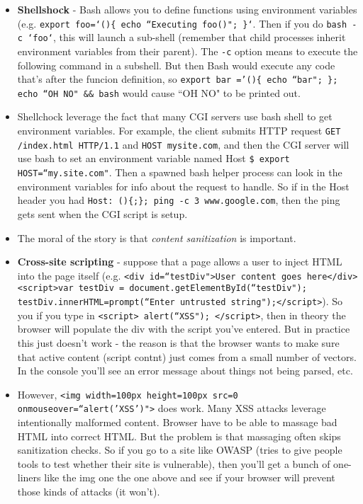 \documentclass[12pt]{article}
\theoremstyle{definition}
\begin{document}
\begin{itemize}
    \item \textbf{Shellshock} - Bash allows you to define functions using environment variables (e.g. \texttt{export foo=`()\{ echo ``Executing foo()"; \}`}. Then if you do \texttt{bash -c `foo`}, this will launch a sub-shell (remember that child processes inherit environment variables from their parent). The \texttt{-c} option means to execute the following command in a subshell. But then Bash would execute any code that's after the funcion definition, so \texttt{export bar ='()\{ echo ``bar"; \}; echo ``OH NO" \&\& bash} would cause ``OH NO" to be printed out.
    \item Shellchock leverage the fact that many CGI servers use bash shell to get environment variables. For example, the client submits HTTP request \texttt{GET /index.html HTTP/1.1} and \texttt{HOST mysite.com}, and then the CGI server will use bash to set an environment variable named Host \texttt{\$ export HOST=``my.site.com"}. Then a spawned bash helper process can look in the environment variables for info about the request to handle. So if in the Host header you had \texttt{Host: ()\{;\}; ping -c 3 www.google.com}, then the ping gets sent when the CGI script is setup. 
    \item The moral of the story is that \textit{content sanitization} is important.
    \item \textbf{Cross-site scripting} - suppose that a page allows a user to inject HTML into the page itself (e.g. \texttt{<div id=``testDiv">User content goes here</div><script>var testDiv = document.getElementById(``testDiv"); testDiv.innerHTML=prompt(``Enter untrusted string");</script>}). So you if you type in \texttt{<script> alert(``XSS"); </script>}, then in theory the browser will populate the div with the script you've entered. But in practice this just doesn't work - the reason is that the browser wants to make sure that active content (script contnt) just comes from a small number of vectors. In the console you'll see an error message about things not being parsed, etc. 
    \item However, \texttt{<img width=100px height=100px src=0 onmouseover=``alert('XSS')">} does work. Many XSS attacks leverage intentionally malformed content. Browser have to be able to massage bad HTML into correct HTML. But the problem is that massaging often skips sanitization checks. So if you go to a site like OWASP (tries to give people tools to test whether their site is vulnerable), then you'll get a bunch of one-liners like the img one the one above and see if your browser will prevent those kinds of attacks (it won't).
\end{itemize}
\end{document}
